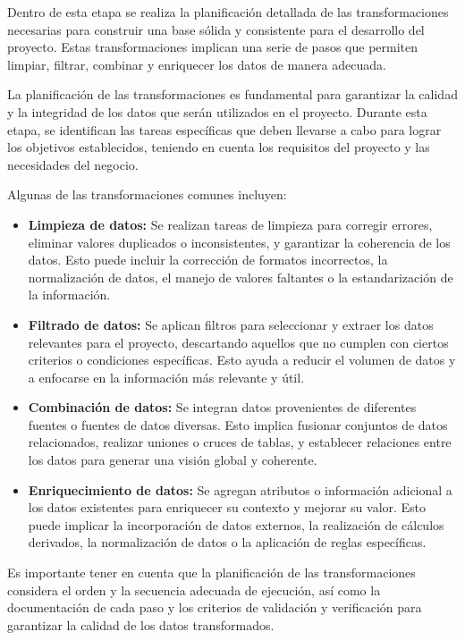 Dentro de esta etapa se realiza la planificación detallada de las transformaciones necesarias para construir una base sólida y consistente para el desarrollo del proyecto. Estas transformaciones implican una serie de pasos que permiten limpiar, filtrar, combinar y enriquecer los datos de manera adecuada.

La planificación de las transformaciones es fundamental para garantizar la calidad y la integridad de los datos que serán utilizados en el proyecto. Durante esta etapa, se identifican las tareas específicas que deben llevarse a cabo para lograr los objetivos establecidos, teniendo en cuenta los requisitos del proyecto y las necesidades del negocio.

Algunas de las transformaciones comunes incluyen:

\begin{itemize}
    \item \textbf{Limpieza de datos:} Se realizan tareas de limpieza para corregir errores, eliminar valores duplicados o inconsistentes, y garantizar la coherencia de los datos. Esto puede incluir la corrección de formatos incorrectos, la normalización de datos, el manejo de valores faltantes o la estandarización de la información.

    \item \textbf{Filtrado de datos:} Se aplican filtros para seleccionar y extraer los datos relevantes para el proyecto, descartando aquellos que no cumplen con ciertos criterios o condiciones específicas. Esto ayuda a reducir el volumen de datos y a enfocarse en la información más relevante y útil.

    \item \textbf{Combinación de datos:} Se integran datos provenientes de diferentes fuentes o fuentes de datos diversas. Esto implica fusionar conjuntos de datos relacionados, realizar uniones o cruces de tablas, y establecer relaciones entre los datos para generar una visión global y coherente.

    \item \textbf{Enriquecimiento de datos:} Se agregan atributos o información adicional a los datos existentes para enriquecer su contexto y mejorar su valor. Esto puede implicar la incorporación de datos externos, la realización de cálculos derivados, la normalización de datos o la aplicación de reglas específicas.
\end{itemize}


Es importante tener en cuenta que la planificación de las transformaciones considera el orden y la secuencia adecuada de ejecución, así como la documentación de cada paso y los criterios de validación y verificación para garantizar la calidad de los datos transformados.
